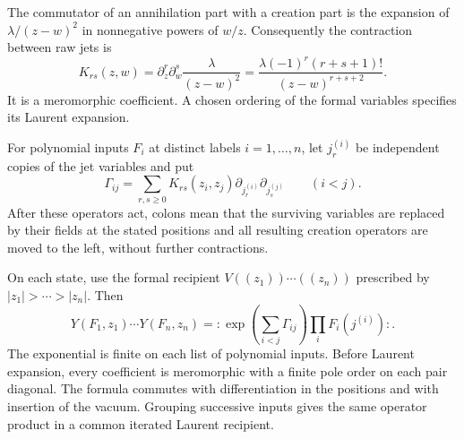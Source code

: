 The commutator of an annihilation part with a creation part is
the expansion of $\lambda/(z-w)^2$ in nonnegative powers of $w/z$.
Consequently the contraction between raw jets is
\begin{equation}\label{eq:vol2-jet-contraction}
 K_{rs}(z,w)
 =\partial_z^r\partial_w^s\frac{\lambda}{(z-w)^2}
 =\frac{\lambda(-1)^r(r+s+1)!}{(z-w)^{r+s+2}}.
\end{equation}
It is a meromorphic coefficient. A chosen ordering of the formal
variables specifies its Laurent expansion.

For polynomial inputs $F_i$ at distinct labels $i=1,\ldots,n$, let
$j_r^{(i)}$ be independent copies of the jet variables and put
\[
 \Gamma_{ij}
 =\sum_{r,s\geq0}K_{rs}(z_i,z_j)
       \partial_{j_r^{(i)}}\partial_{j_s^{(j)}}\qquad(i<j).
\]
After these operators act, colons mean that the surviving variables
are replaced by their fields at the stated positions and all resulting
creation operators are moved to the left, without further contractions.

\begin{proposition}
\label{prop:vol2-wick-evaluator}
On each state, use the formal recipient
$V((z_1))\cdots((z_n))$ prescribed by
$|z_1|>\cdots>|z_n|$. Then
\begin{equation}\label{eq:vol2-wick-evaluator}
 Y(F_1,z_1)\cdots Y(F_n,z_n)
 ={:}\exp\left(\sum_{i<j}\Gamma_{ij}\right)
                       \prod_iF_i(j^{(i)}){:}.
\end{equation}
The exponential is finite on each list of polynomial inputs. Before
Laurent expansion, every coefficient is meromorphic with a finite pole
order on each pair diagonal. The formula commutes with differentiation
in the positions and with insertion of the vacuum. Grouping successive
inputs gives the same operator product in a common iterated Laurent
recipient.
\end{proposition}

